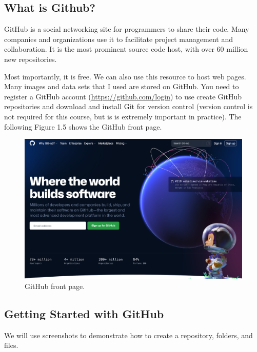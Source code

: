 \documentclass[
]{book}
\begin{document}
\hypertarget{what-is-github}{%
\subsection{What is Github?}\label{what-is-github}}

GitHub is a social networking site for programmers to share their code. Many companies and organizations use it to facilitate project management and collaboration. It is the most prominent source code host, with over 60 million new repositories.

Most importantly, it is free. We can also use this resource to host web pages. Many images and data sets that I used are stored on GitHub. You need to register a GitHub account (\url{https://github.com/login}) to use create GitHub repositories and download and install Git for version control (version control is not required for this course, but is is extremely important in practice). The following Figure 1.5 shows the GitHub front page.

\begin{figure}

{\centering \includegraphics[width=0.9\linewidth]{img00/github} 

}

\caption{GitHub front page.}\label{fig:unnamed-chunk-11}
\end{figure}

\hypertarget{getting-started-with-github}{%
\subsection{Getting Started with GitHub}\label{getting-started-with-github}}

We will use screenshots to demonstrate how to create a repository, folders, and files.
\end{document}
